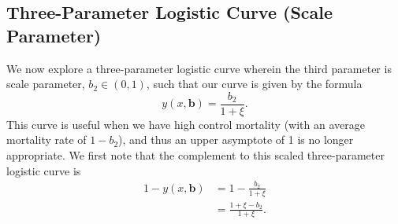 \documentclass[11pt, letterpaper]{article}
\numberwithin{equation}{section}
\begin{document}
\subsection{Three-Parameter Logistic Curve (Scale Parameter)}
We now explore a three-parameter logistic curve wherein the third parameter is scale parameter, $b_2 \in (0,1)$, such that our curve is given by the formula
$$ y(x, \bm b) = \frac{b_2}{1+\xi} .$$ 
This curve is useful when we have high control mortality (with an average mortality rate of $1-b_2$), and thus an upper asymptote of 1 is no longer appropriate. We first note that the complement to this scaled three-parameter logistic curve is 
\begin{align*}
1 - y(x, \bm b) & = 1- \frac{b_2}{1+\xi} \\
& = \frac{1+\xi - b_2}{1+\xi}.
\end{align*}
\end{document}
